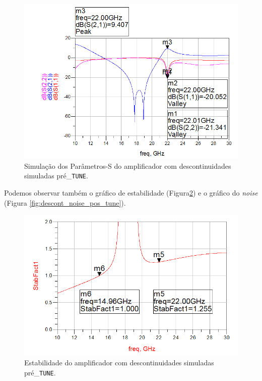 \documentclass[11pt]{article}
\numberwithin{equation}{section}
\begin{document}
\begin{figure}[H]
	\centering
	\includegraphics[keepaspectratio=true, scale=0.45]{exps/descont_S_pos_tune}
	\vspace{-0.5em}
	\caption{Simulação dos Parâmetros-S do amplificador com descontinuidades simuladas pré\_\texttt{TUNE}.}
	\vspace{-0.8em}
	\label{fig:descont_S_pos_tune}
\end{figure}

Podemos observar também o gráfico de estabilidade (Figura\ref{fig:descont_estab_pos_tune}) e o gráfico do \textit{noise} (Figura \ref{fig:descont_noise_pos_tune}).

\begin{figure}[H]
	\centering
	\includegraphics[keepaspectratio=true, scale=0.45]{exps/descont_estab_pos_tune}
	\vspace{-0.5em}
	\caption{Estabilidade do amplificador com descontinuidades simuladas pré\_\texttt{TUNE}.}
	\vspace{-0.8em}
	\label{fig:descont_estab_pos_tune}
\end{figure}
\end{document}
